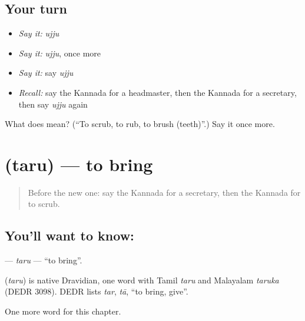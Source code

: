 \subsection*{Your turn}
\begin{itemize}
\raggedright
  \item \emph{Say it:} \emph{ujju}
  \item \emph{Say it:} \emph{ujju}, once more
  \item \emph{Say it:} say \emph{ujju}
  \item \emph{Recall:} say the Kannada for a headmaster, then the Kannada for a secretary, then say \emph{ujju} again
\end{itemize}

\begin{tcolorbox}[breakable,colback=teal!4,colframe=teal!35!black,title={Before you move on}]
What does  mean? (\textquotedblleft{}To scrub, to rub, to brush (teeth)\textquotedblright{}.) Say it once more.
\end{tcolorbox}
\section[\texorpdfstring{\kn{ತರು} (taru)}{ತರು (taru)}]{ (taru) — to bring}

\label{lesson:KA-C198-taru}



\begin{quote}
Before the new one: say the Kannada for a secretary, then the Kannada for to scrub.
\end{quote}

\subsection*{You'll want to know: }
\textbf{} — \emph{taru} — \textquotedblleft{}to bring\textquotedblright{}.

\begin{cousinweb}
\textbf{} (\emph{taru}) is native Dravidian, one word with Tamil \emph{taru} and Malayalam \emph{taruka} (DEDR 3098). DEDR lists \emph{tar}, \emph{tā}, \textquotedblleft{}to bring, give\textquotedblright{}.
\end{cousinweb}

\begin{grammarlens}[title={What you've built}]
One more word for this chapter.
\end{grammarlens}

